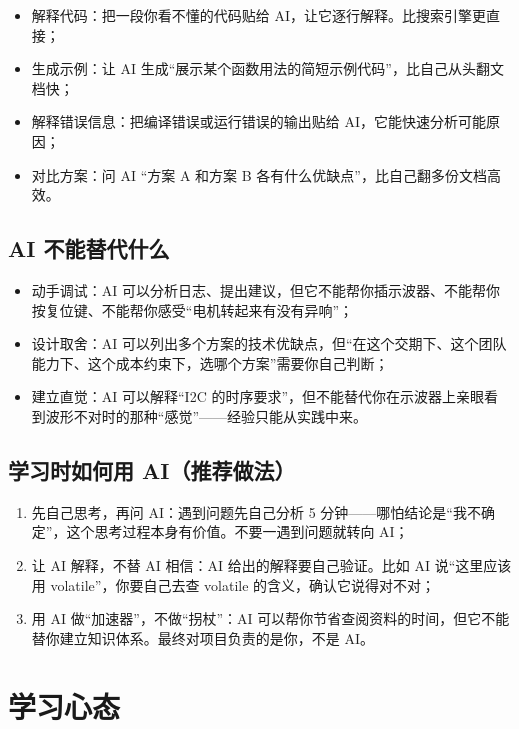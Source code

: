 \begin{itemize}
	\item 解释代码：把一段你看不懂的代码贴给 AI，让它逐行解释。比搜索引擎更直接；
	\item 生成示例：让 AI 生成“展示某个函数用法的简短示例代码”，比自己从头翻文档快；
	\item 解释错误信息：把编译错误或运行错误的输出贴给 AI，它能快速分析可能原因；
	\item 对比方案：问 AI “方案 A 和方案 B 各有什么优缺点”，比自己翻多份文档高效。
\end{itemize}

\subsection{AI 不能替代什么}

\begin{itemize}
	\item 动手调试：AI 可以分析日志、提出建议，但它不能帮你插示波器、不能帮你按复位键、不能帮你感受“电机转起来有没有异响”；
	\item 设计取舍：AI 可以列出多个方案的技术优缺点，但“在这个交期下、这个团队能力下、这个成本约束下，选哪个方案”需要你自己判断；
	\item 建立直觉：AI 可以解释“I2C 的时序要求”，但不能替代你在示波器上亲眼看到波形不对时的那种“感觉”——经验只能从实践中来。
\end{itemize}

\subsection{学习时如何用 AI（推荐做法）}

\begin{enumerate}
	\item 先自己思考，再问 AI：遇到问题先自己分析 5 分钟——哪怕结论是“我不确定”，这个思考过程本身有价值。不要一遇到问题就转向 AI；
	\item 让 AI 解释，不替 AI 相信：AI 给出的解释要自己验证。比如 AI 说“这里应该用 volatile”，你要自己去查 volatile 的含义，确认它说得对不对；
	\item 用 AI 做“加速器”，不做“拐杖”：AI 可以帮你节省查阅资料的时间，但它不能替你建立知识体系。最终对项目负责的是你，不是 AI。
\end{enumerate}

\section{学习心态}

